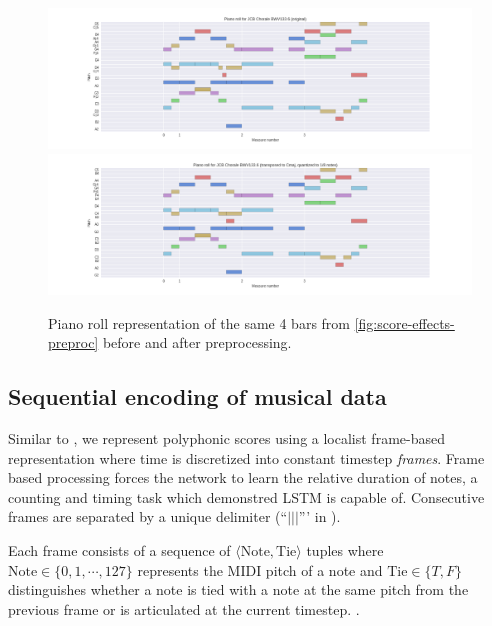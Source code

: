 \documentclass[dissertation.tex]{subfiles}
\begin{document}
\begin{figure}[htpb]
    \centering
        \includegraphics[width=1.0\linewidth]{Figures/bwv133-6-original-piano-roll.png}
        \includegraphics[width=1.0\linewidth]{Figures/bwv133-6-preproc-piano-roll.png}
    \caption{Piano roll representation of the same 4 bars from \autoref{fig:score-effects-preproc}
    before and after preprocessing.}
    \label{fig:piano-roll-effects-preproc}
\end{figure}


\subsection{Sequential encoding of musical data}

Similar to \cite{todd1989connectionist}, we represent polyphonic scores using a
localist frame-based representation where time is discretized into constant
timestep \emph{frames}. Frame based processing forces the network to learn the
relative duration of notes, a counting and timing task which
\cite{gers2002learning} demonstred LSTM is capable of. Consecutive frames are
separated by a unique delimiter (``$|||$''' in ).

Each frame consists of a sequence of $\langle \text{Note}, \text{Tie} \rangle$
tuples where $\text{Note} \in \{0,1,\cdots,127\}$ represents the MIDI pitch of
a note and $\text{Tie} \in \{T,F\}$ distinguishes whether a note is tied with a
note at the same pitch from the previous frame or is articulated at the current
timestep. .
\end{document}
